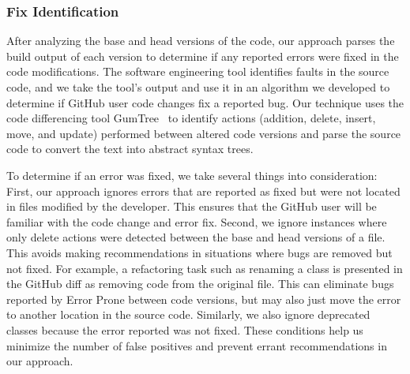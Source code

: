 \documentclass[sigconf,review,anonymous]{acmart}
\newcommand{\tool}{\textsl{tool-recommender-bot}}
\begin{document}
\subsubsection{Fix Identification}

After analyzing the base and head versions of the code, our approach parses the build output of each version to determine if any reported errors were fixed in the code modifications. The software engineering tool identifies faults in the source code, and we take the tool's output and use it in an algorithm we developed to determine if GitHub user code changes fix a reported bug. Our technique uses the code differencing tool GumTree~\cite{GumTree} to identify actions (addition, delete, insert, move, and update) performed between altered code versions and parse the source code to convert the text into abstract syntax trees. 

To determine if an error was fixed, we take several things into consideration: First, our approach ignores errors that are reported as fixed but were not located in files modified by the developer. This ensures that the GitHub user will be familiar with the code change and error fix. Second, we ignore instances where only delete actions were detected between the base and head versions of a file. This avoids making recommendations in situations where bugs are removed but not fixed. For example, a refactoring task such as renaming a class is presented in the GitHub diff as removing code from the original file. This can eliminate bugs reported by Error Prone between code versions, but may also just move the error to another location in the source code. Similarly, we also ignore deprecated classes because the error reported was not fixed. These conditions help us minimize the number of false positives and prevent errant recommendations in our approach.

\end{document}

